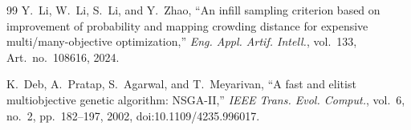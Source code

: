 \begin{thebibliography}{99}
Y.~Li, W.~Li, S.~Li, and Y.~Zhao, ``An infill sampling criterion based on
improvement of probability and mapping crowding distance for expensive
multi/many-objective optimization,'' \textit{Eng. Appl. Artif. Intell.},
vol.~133, Art.~no.~108616, 2024.

K.~Deb, A.~Pratap, S.~Agarwal, and T.~Meyarivan,
``A fast and elitist multiobjective genetic algorithm: NSGA-II,''
\textit{IEEE Trans. Evol. Comput.},
vol.~6, no.~2, pp.~182--197, 2002,
doi:10.1109/4235.996017.

\end{thebibliography}
